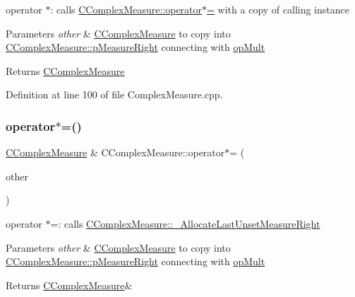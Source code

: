 operator $\ast$\+: calls \hyperlink{classCComplexMeasure_a66de753c892ed0a82fa8f2eb4d98029d}{C\+Complex\+Measure\+::operator$\ast$=} with a copy of calling instance 


\begin{DoxyParams}{Parameters}
{\em other} & \hyperlink{classCComplexMeasure}{C\+Complex\+Measure} to copy into \hyperlink{classCComplexMeasure_abbafc4b16676d223ed34860b8ece1b6b}{C\+Complex\+Measure\+::p\+Measure\+Right} connecting with \hyperlink{MeasureOperator_8h_a1431c79e3ad4b4c5bcc9f31f188538f2ad474827f099ae98a2f2c92e1ef548eb2}{op\+Mult} \\
\hline
\end{DoxyParams}
\begin{DoxyReturn}{Returns}
\hyperlink{classCComplexMeasure}{C\+Complex\+Measure} 
\end{DoxyReturn}


Definition at line 100 of file Complex\+Measure.\+cpp.

\mbox{\label{classCComplexMeasure_a66de753c892ed0a82fa8f2eb4d98029d}} 
\subsubsection{\texorpdfstring{operator$\ast$=()}{operator*=()}}
{\footnotesize\ttfamily \hyperlink{classCComplexMeasure}{C\+Complex\+Measure} \& C\+Complex\+Measure\+::operator$\ast$= (\begin{DoxyParamCaption}\item[{const \hyperlink{classCComplexMeasure}{C\+Complex\+Measure} \&}]{other }\end{DoxyParamCaption})}



operator $\ast$=\+: calls \hyperlink{classCComplexMeasure_aee812c93b8b2fe3839e9a38df63cfd53}{C\+Complex\+Measure\+::\+\_\+\+Allocate\+Last\+Unset\+Measure\+Right} 


\begin{DoxyParams}{Parameters}
{\em other} & \hyperlink{classCComplexMeasure}{C\+Complex\+Measure} to copy into \hyperlink{classCComplexMeasure_abbafc4b16676d223ed34860b8ece1b6b}{C\+Complex\+Measure\+::p\+Measure\+Right} connecting with \hyperlink{MeasureOperator_8h_a1431c79e3ad4b4c5bcc9f31f188538f2ad474827f099ae98a2f2c92e1ef548eb2}{op\+Mult} \\
\hline
\end{DoxyParams}
\begin{DoxyReturn}{Returns}
\hyperlink{classCComplexMeasure}{C\+Complex\+Measure}\& 
\end{DoxyReturn}


